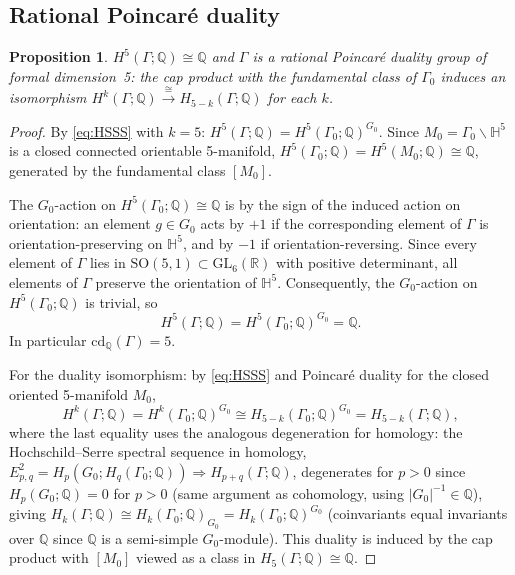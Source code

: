 \documentclass[12pt]{article}
\newtheorem{proposition}[theorem]{Proposition}
\theoremstyle{definition}
\theoremstyle{remark}
\begin{document}
\subsection{Rational Poincar\'e duality}
\label{sub:rpd}

\begin{proposition}
\label{prop:rpd}
$H^5(\Gamma;\mathbb{Q}) \cong \mathbb{Q}$ and $\Gamma$ is a rational Poincar\'e duality
group of formal dimension~5: the cap product with the fundamental class of $\Gamma_0$
induces an isomorphism $H^k(\Gamma;\mathbb{Q}) \xrightarrow{\;\cong\;} H_{5-k}(\Gamma;\mathbb{Q})$
for each $k$.
\end{proposition}

\begin{proof}
By \eqref{eq:HSSS} with $k = 5$:
$H^5(\Gamma;\mathbb{Q}) = H^5(\Gamma_0;\mathbb{Q})^{G_0}$.
Since $M_0 = \Gamma_0 \backslash \mathbb{H}^5$ is a closed connected orientable 5-manifold,
$H^5(\Gamma_0;\mathbb{Q}) = H^5(M_0;\mathbb{Q}) \cong \mathbb{Q}$, generated by the
fundamental class $[M_0]$.

The $G_0$-action on $H^5(\Gamma_0;\mathbb{Q}) \cong \mathbb{Q}$ is by the sign of the
induced action on orientation: an element $g \in G_0$ acts by $+1$ if the corresponding
element of $\Gamma$ is orientation-preserving on $\mathbb{H}^5$, and by $-1$ if
orientation-reversing. Since every element of $\Gamma$ lies in $\mathrm{SO}(5,1) \subset
\mathrm{GL}_6(\mathbb{R})$ with positive determinant, all elements of $\Gamma$ preserve the
orientation of $\mathbb{H}^5$. Consequently, the $G_0$-action on $H^5(\Gamma_0;\mathbb{Q})$
is trivial, so
\[
  H^5(\Gamma;\mathbb{Q}) = H^5(\Gamma_0;\mathbb{Q})^{G_0} = \mathbb{Q}.
\]
In particular $\mathrm{cd}_\mathbb{Q}(\Gamma) = 5$.

For the duality isomorphism: by \eqref{eq:HSSS} and Poincar\'e duality for the closed
oriented 5-manifold $M_0$,
\[
  H^k(\Gamma;\mathbb{Q}) = H^k(\Gamma_0;\mathbb{Q})^{G_0} \cong H_{5-k}(\Gamma_0;\mathbb{Q})^{G_0}
  = H_{5-k}(\Gamma;\mathbb{Q}),
\]
where the last equality uses the analogous degeneration for homology: the
Hochschild--Serre spectral sequence in homology,
$E^2_{p,q} = H_p(G_0; H_q(\Gamma_0;\mathbb{Q})) \Rightarrow H_{p+q}(\Gamma;\mathbb{Q})$,
degenerates for $p > 0$ since $H_p(G_0;\mathbb{Q}) = 0$ for $p > 0$ (same argument
as cohomology, using $|G_0|^{-1} \in \mathbb{Q}$), giving
$H_k(\Gamma;\mathbb{Q}) \cong H_k(\Gamma_0;\mathbb{Q})_{G_0} = H_k(\Gamma_0;\mathbb{Q})^{G_0}$
(coinvariants equal invariants over $\mathbb{Q}$ since $\mathbb{Q}$ is a semi-simple
$G_0$-module). This duality is induced by the cap product with $[M_0]$
viewed as a class in $H_5(\Gamma;\mathbb{Q}) \cong \mathbb{Q}$.
\end{proof}
\end{document}
